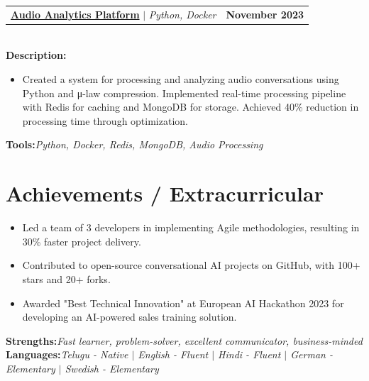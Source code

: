 \documentclass[letterpaper,11pt]{article}
\makeatletter
\newcommand{\resumeItem}[1]{
  \item\small{
    {#1 \vspace{-2pt}}
  }
}
\newcommand{\resumeProjectHeading}[2]{
    \item
    \begin{tabular*}{1.001\textwidth}{l@{\extracolsep{\fill}}r}
      \small#1 & \textbf{\small #2}\\
    \end{tabular*}\vspace{-7pt}
}
\newcommand{\resumeSubHeadingListStart}{\begin{itemize}[leftmargin=0.0in, label={}]}
\newcommand{\resumeSubHeadingListEnd}{\end{itemize}}
\newcommand{\resumeItemListStart}{\begin{itemize}}
\newcommand{\resumeItemListEnd}{\end{itemize}\vspace{-5pt}}
\makeatother
\begin{document}
\resumeProjectHeading
{\href{https://github.com/yakkshit/audio-analytics}{\textbf{Audio Analytics Platform}} $|$ \emph{Python, Docker}}{November 2023}\\
\vspace{6pt}
\textbf{Description:}
\vspace{-5pt}
\resumeItemListStart
\resumeItem{Created a system for processing and analyzing audio conversations using Python and μ-law compression. Implemented real-time processing pipeline with Redis for caching and MongoDB for storage. Achieved 40\% reduction in processing time through optimization.}
\resumeItemListEnd
\vspace{4pt}
\textbf{Tools:}\emph{Python, Docker, Redis, MongoDB, Audio Processing}
\vspace{-12pt}

\section{Achievements / Extracurricular}
\resumeSubHeadingListStart
\resumeItemListStart
\resumeItem{Led a team of 3 developers in implementing Agile methodologies, resulting in 30\% faster project delivery.}
\resumeItem{Contributed to open-source conversational AI projects on GitHub, with 100+ stars and 20+ forks.}
\resumeItem{Awarded "Best Technical Innovation" at European AI Hackathon 2023 for developing an AI-powered sales training solution.}
\resumeItemListEnd

\resumeSubHeadingListEnd
\textbf{Strengths:}\emph{Fast learner, problem-solver, excellent communicator, business-minded} \\
\textbf{Languages:}\emph{Telugu - Native $|$ English - Fluent $|$ Hindi - Fluent $|$ German - Elementary $|$ Swedish - Elementary}

\vspace{10pt}
\end{document}
